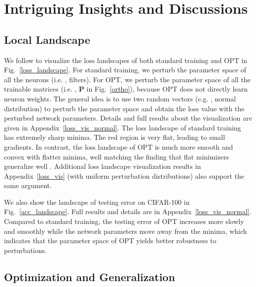 \section{Intriguing Insights and Discussions}

\subsection{Local Landscape}\label{main_landscape}

We follow \cite{li2018visualizing} to visualize the loss landscapes of both standard training and OPT in Fig.~\ref{loss_landscape}. For standard training, we perturb the parameter space of all the neurons (i.e. , filters). For OPT, we perturb the parameter space of all the trainable matrices (i.e. , $\bm{P}$ in Fig.~\ref{ortho}), because OPT does not directly learn neuron weights. The general idea is to use two random vectors (e.g. , normal distribution) to perturb the parameter space and obtain the loss value with the perturbed network parameters. Details and full results about the visualization are given in Appendix~\ref{loss_vis_normal}. The loss landscape of standard training has extremely sharp minima. The red region is very flat, leading to small gradients. In contrast, the loss landscape of OPT is much more smooth and convex with flatter minima, well matching the finding that flat minimizers generalize well \cite{hochreiter1997flat,chaudhari2017entropy,izmailov2018averaging}. Additional loss landscape visualization results in Appendix~\ref{loss_vis} (with uniform perturbation distributions) also support the same argument.

We also show the landscape of testing error on CIFAR-100 in Fig.~\ref{acc_landscape}. Full results and details are in Appendix~\ref{loss_vis_normal}. Compared to standard training, the testing error of OPT increases more slowly and smoothly while the network parameters move away from the minima, which indicates that the parameter space of OPT yields better robustness to perturbations.

\subsection{Optimization and Generalization}

